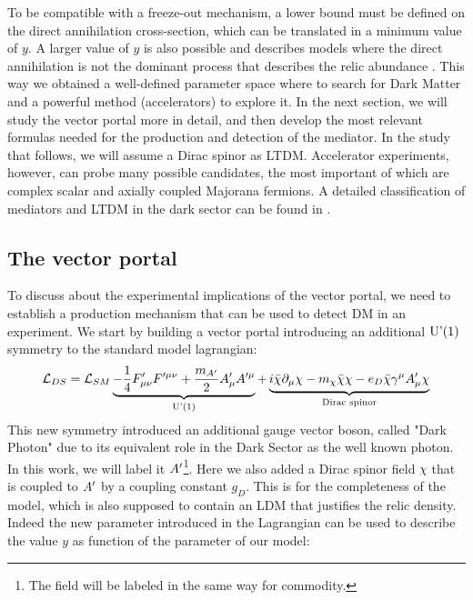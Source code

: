  To be compatible with a freeze-out mechanism, a lower bound must be defined on the direct annihilation cross-section, which can be translated in a minimum value of $y$. A larger value of $y$ is also possible and describes models where the direct annihilation is not the dominant process that describes the relic abundance \cite{battaglieri2017cosmic}. This way we obtained a well-defined parameter space where to search for Dark Matter and a powerful method (accelerators) to explore it. In the next section, we will study the vector portal more in detail, and then develop the most relevant formulas needed for the production and detection of the mediator. In the study that follows, we will assume a Dirac spinor as LTDM. Accelerator experiments, however, can probe many possible candidates, the most important of which are complex scalar and axially coupled Majorana fermions. A detailed classification of mediators and LTDM in the dark sector can be found in \cite{PhysRevD.92.123531}.

\subsection{The vector portal}
\label{ch1:sec:dm-colliders}

To discuss about the experimental implications of the vector portal, we need to establish a production mechanism that can be used to detect DM in an experiment. We start by building a vector portal introducing an additional $\textrm{U'(1)}$ symmetry to the standard model lagrangian:
\begin{equation}
  \label{eq:dm-lagrangian}
  \mathcal{L}_{DS} = \mathcal{L}_{SM} \underbrace{- \frac{1}{4}F'_{\mu \nu}F'^{\mu \nu} + \frac{m_{A'}}{2}A'_{\mu}A'^{\mu}}_{\textrm{U'(1)}} + \underbrace{i \bar{\chi} \partial_{\mu} \chi - m_{\chi}\bar{\chi}\chi - e_D \bar{\chi}\gamma^{\mu}A'_{\mu}\chi}_{\textrm{Dirac spinor}}
\end{equation}
This new symmetry introduced an additional gauge vector boson, called "Dark Photon" due to its equivalent role in the Dark Sector as the well known photon. In this work, we will label it $A'$\footnote{The field will be labeled in the same way for commodity.}. Here we also added a Dirac spinor field $\chi$ that is coupled to $A'$ by a coupling constant $g_D$. This is for the completeness of the model, which is also supposed to contain an LDM that justifies the relic density. Indeed the new parameter introduced in the Lagrangian can be used to describe the value $y$ as function of the parameter of our model:

